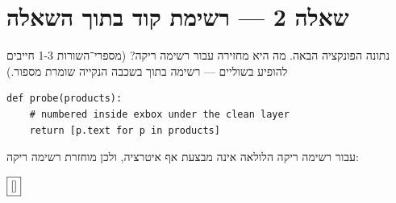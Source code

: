 \chapter{שאלה 2 — רשימת קוד בתוך השאלה }

\begin{exbox}
נתונה הפונקציה הבאה. מה היא מחזירה עבור רשימה ריקה? (מספרי־השורות
1-3 חייבים להופיע בשוליים — רשימה בתוך  בשכבה הנקייה
שומרת מספור.)
\begin{asmblock}
\begin{lstlisting}[style=pystyle]
def probe(products):
    # numbered inside exbox under the clean layer
    return [p.text for p in products]
\end{lstlisting}
\end{asmblock}
\end{exbox}

עבור רשימה ריקה הלולאה אינה מבצעת אף איטרציה, ולכן מוחזרת רשימה ריקה:
\begin{center}
$\boxed{\text{[]}}$
\end{center}


